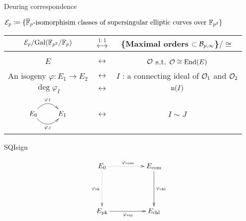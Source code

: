 \begin{frame}{Deuring correspondence}

    {\fontsize{11pt}{13pt}\selectfont
    $\mathcal{E}_p \coloneqq \{\overline{\mathbb{F}}_p\mbox{-isomorphisim classes of supersingular elliptic curves over }\mathbb{F}_{p^2} \}$\\
    \begin{itembox}{}
        \begin{center}
            \begin{tabular}{ccc}
                $\mathcal{E}_p/\mathrm{Gal}(\mathbb{F}_{p^2}/\mathbb{F}_p)$ & $\stackrel{1:1}{\longleftrightarrow}$
                    & \{Maximal orders $\subset \mathcal{B}_{p,\infty}$\}$/\cong$\\[5pt]\hline\\[5pt]
                $E$  & $\longleftrightarrow$
                    & $\mathcal{O}$ s.t. $\mathcal{O} \cong \mathrm{End}(E)$\\[7pt]
                An isogeny $\varphi: E_1 \to E_2$ & $\longleftrightarrow$
                    & $I$ : a connecting ideal of $\mathcal{O}_1$ and $\mathcal{O}_2$\\[7pt]
                $\deg\varphi_I$ & $\longleftrightarrow$ & $\mathrm{n}(I)$\\[7pt]
                $\xymatrix{
                    E_0 \ar@/^15pt/[r]^{{\varphi_I}} \ar@/_15pt/[r]_{{\varphi_J}} & E_1
                }$ & $\longleftrightarrow$ & $I \sim J$
            \end{tabular}
        \end{center}
    \end{itembox}
    }
\end{frame}

\begin{frame}{SQIsign}

    {\large
    \begin{equation*}
        \xymatrix@C=50pt@R=50pt{
            E_0 \ar@{..>}[d]_{\varphi_\mathrm{sk}} \ar@{..>}[r]^{\varphi_{\mathrm{com}}}
                & E_{\mathrm{com}} \ar[d]^{\varphi_\mathrm{chl}}\\
            E_{\mathrm{pk}} \ar[r]_{\varphi_\mathrm{rsp}} & E_{\mathrm{chl}}
        }
    \end{equation*}
    }
\end{frame}

